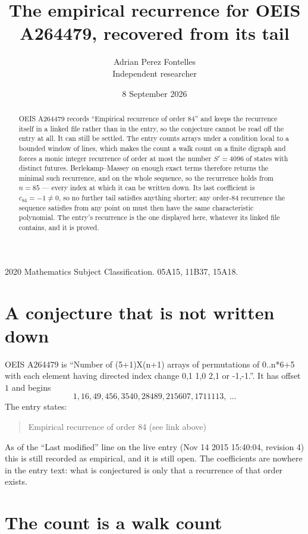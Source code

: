 \documentclass[11pt,a4paper]{article}
\title{The empirical recurrence for OEIS A264479, recovered from its tail}
\author{Adrian Perez Fontelles\\ \small Independent researcher}
\date{8 September 2026}
\theoremstyle{plain}
\theoremstyle{definition}
\begin{document}
\maketitle

\begin{abstract}
OEIS A264479 records ``Empirical recurrence of order $84$'' and keeps the recurrence itself in
a linked file rather than in the entry, so the conjecture cannot be read off the entry at all.
It can still be settled. The entry counts arrays under a condition local to a bounded window of
lines, which makes the count a walk count on a finite digraph and forces a monic integer
recurrence of order at most the number $S'=4096$ of states with distinct futures. Berlekamp--Massey on
enough exact terms therefore returns the minimal such recurrence, and on the whole sequence, so the recurrence holds from $n=85$ --- every index at which it can be written down.
Its last coefficient is $c_{84}=-1\neq0$, so no further tail satisfies anything
shorter; any order-$84$ recurrence the sequence satisfies from any point on must then have
the same characteristic polynomial. The entry's recurrence is the one displayed here, whatever
its linked file contains, and it is proved.
\end{abstract}

\noindent\small 2020 Mathematics Subject Classification. 05A15, 11B37, 15A18.\normalsize

\section{A conjecture that is not written down}

OEIS A264479 is ``Number of (5+1)X(n+1) arrays of permutations of 0..n*6+5 with each element having directed index change 0,1 1,0 2,1 or -1,-1.''. It has offset $1$ and begins
\[
1, 16, 49, 456, 3540, 28489, 215607, 1711113,\ \dots
\]
The entry states:
\begin{quote}
Empirical recurrence of order 84 (see link above)
\end{quote}
As of the ``Last modified'' line on the live entry (Nov 14 2015 15:40:04, revision 4)
this is still recorded as empirical, and it is still open. The coefficients are nowhere in the
entry text: what is conjectured is only that a recurrence of that order exists.

\section{The count is a walk count}
\end{document}
